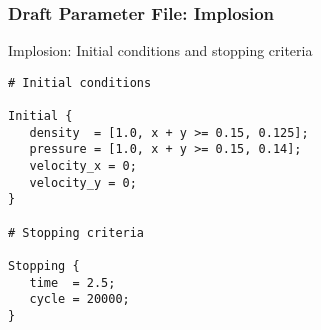 \begin{frame}[fragile] \frametitle{Draft Parameter File: Implosion}
 \footnotesize
\begin{block}{Implosion: Initial conditions and stopping criteria}
\begin{verbatim}
# Initial conditions

Initial {
   density  = [1.0, x + y >= 0.15, 0.125];
   pressure = [1.0, x + y >= 0.15, 0.14];
   velocity_x = 0;
   velocity_y = 0;
}

# Stopping criteria

Stopping {
   time  = 2.5;
   cycle = 20000;
}
\end{verbatim}
\end{block}
\end{frame}

